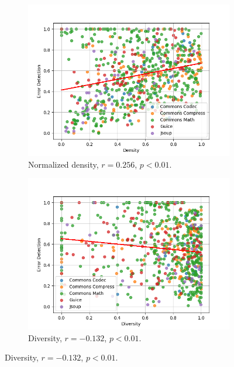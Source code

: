 \documentclass[twoside,a4paper,11pt]{memoir}
\begin{document}
\begin{figure}
    \centering
    \begin{subfigure}[b]{0.49\linewidth}
        \centering
        \includegraphics[width=\linewidth]{figures/error_detection_density}
        \caption{Normalized density, \(r=0.256 \), \(p<0.01 \).}%
        \label{fig:error_detection_density}
    \end{subfigure}
    \hfill
    \begin{subfigure}[b]{0.49\linewidth}
        \centering
        \includegraphics[width=\linewidth]{figures/error_detection_diversity}
        \caption{Diversity, \(r=-0.132 \), \(p < 0.01 \).}%
        \label{fig:error_detection_diversity}
    \end{subfigure}

\end{figure}
\end{document}
